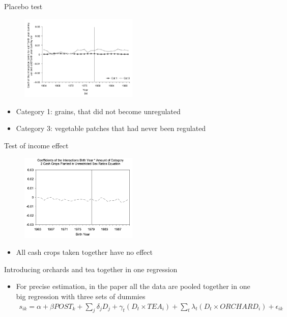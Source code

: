 \documentclass[11pt,notes=hide,aspectratio=169,mathserif]{beamer}
\begin{document}
\begin{frame}{Placebo test}
\begin{figure}
\centering
\includegraphics[width=0.5\textwidth]{inputs/fig3a.png}
\end{figure}
\begin{itemize}
    \pause  \item Category 1: grains, that did not become unregulated
    \pause  \item Category 3:  vegetable patches that had never been regulated
\end{itemize}
\end{frame}

\begin{frame}{Test of income effect}
\begin{figure}
\centering
\includegraphics[width=0.5\textwidth]{inputs/inc.png}
\end{figure}
\begin{itemize}
\item All cash crops taken together have no effect
\end{itemize}
\end{frame}

\begin{frame}{Introducing orchards and tea together in one regression}
\begin{itemize}
\item For precise estimation, in the paper all the data are pooled together in one big regression with three sets of dummies
\begin{align*}
    s_{ik} = \alpha + \beta POST_k + \sum_j \delta_j D_j +  \gamma_t (D_t \times TEA_i) + \sum_t \lambda_t (D_t \times ORCHARD_i) + \epsilon_{ik}
\end{align*}
\end{itemize}
\end{frame}
\end{document}
